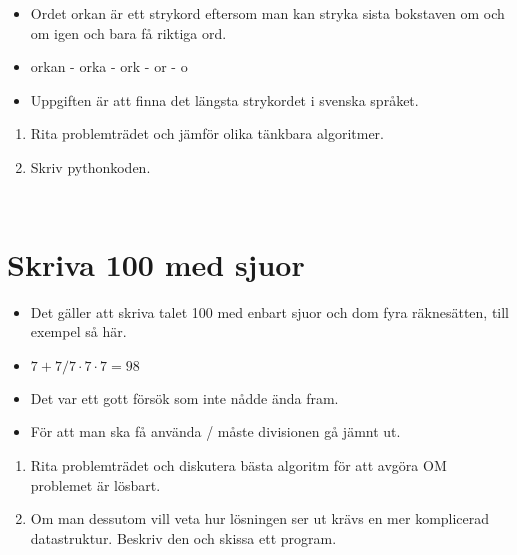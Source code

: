 \begin{frame}
  \begin{exercise}
    \begin{itemize}
      \item Ordet orkan är ett strykord eftersom man kan stryka sista bokstaven 
        om och om igen och bara få riktiga ord.
      \item orkan - orka - ork - or - o
      \item Uppgiften är att finna det längsta strykordet i svenska språket.
    \end{itemize}
    \begin{enumerate}
      \item Rita problemträdet och jämför olika tänkbara algoritmer.
      \item Skriv pythonkoden.
    \end{enumerate}
  \end{exercise}
\end{frame}

\begin{frame}
  \begin{solution}[Strykord]
    \inputminted[firstline=3,lastline=13]{python}{src/strykord.py}
  \end{solution}
\end{frame}

\begin{frame}
  \begin{solution}
    \inputminted[firstline=15,lastline=23]{python}{src/strykord.py}
  \end{solution}
\end{frame}


\section{Skriva 100 med sjuor}

\begin{frame}
  \begin{exercise}
    \begin{itemize}
      \item Det gäller att skriva talet 100 med enbart sjuor och dom fyra 
        räknesätten, till exempel så här.
      \item \(7 + 7 / 7 \cdot 7 \cdot 7 = 98\)
      \item Det var ett gott försök som inte nådde ända fram.
      \item För att man ska få använda / måste divisionen gå jämnt ut.
    \end{itemize}
    \begin{enumerate}
      \item Rita problemträdet och diskutera bästa algoritm för att avgöra OM 
        problemet är lösbart.
      \item Om man dessutom vill veta hur lösningen ser ut krävs en mer 
        komplicerad datastruktur.
        Beskriv den och skissa ett program.
    \end{enumerate}
  \end{exercise}
\end{frame}

